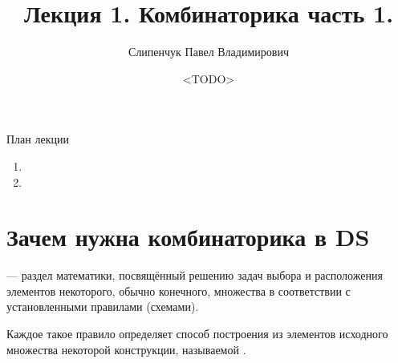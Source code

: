 
  

\title{Лекция 1. Комбинаторика часть 1.}
\date{<TODO>}
\author{Слипенчук Павел Владимирович}



  \maketitle
    
  \begin{frame}{План лекции}\label{frame:plan}
    \begin{enumerate}
	\item {}
	\item {}
	\end{enumerate}
 \end{frame}
    
\section{Зачем нужна комбинаторика в DS}\label{section:why_combinatorics}
\begin{frame}
 — раздел математики, посвящённый 
решению задач выбора и расположения элементов некоторого, обычно конечного, множества
в соответствии с установленными правилами (схемами). 

Каждое такое правило определяет способ построения из элементов исходного множества некоторой конструкции, 
называемой . 
\end{frame}


